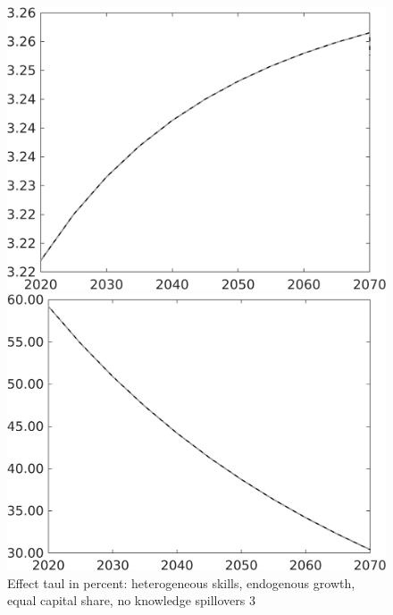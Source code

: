 \documentclass[12pt]{article}
\begin{document}
\begin{figure}[h!!]
	\centering
	\caption{Effect taul in percent: heterogeneous skills, endogenous growth, equal capital share, no knowledge spillovers 3}\label{fig:LF_BAU_nsk0_xgr0_equalcapShare_noknow3}
	
	\begin{minipage}[]{0.32\textwidth}
		\includegraphics[width=1\textwidth]{../../codding_model/own_basedOnFried/optimalPol_010922_revision/figures/all_13Sept22/CompTaul_Equlab_LFBAU_Reg0_gAn_spillover0_nsk0_xgr0_knspil1_sep1_countec0_GovRev0_etaa0.79_lgd0.png}
	\end{minipage}	
	\begin{minipage}[]{0.32\textwidth}
		\includegraphics[width=1\textwidth]{../../codding_model/own_basedOnFried/optimalPol_010922_revision/figures/all_13Sept22/CompTaul_Equlab_LFBAU_Reg0_gAg_spillover0_nsk0_xgr0_knspil1_sep1_countec0_GovRev0_etaa0.79_lgd0.png}

\end{minipage}
\end{figure}
\end{document}
